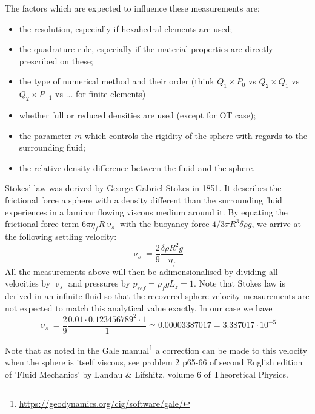 \noindent The factors which are expected to influence these measurements are:
\begin{itemize}
\item the resolution, especially if hexahedral elements are used;
\item the quadrature rule, especially if the material properties are directly prescribed on these;
\item the type of numerical method and their order (think $Q_1\times P_0$ vs $Q_2\times Q_1$ vs $Q_2 \times P_{-1}$
      vs ... for finite elements)
\item whether full or reduced densities are used (except for OT case);
\item the parameter $m$ which controls the rigidity of the sphere with regards to the surrounding fluid;
\item the relative density difference between the fluid and the sphere.
\end{itemize}

Stokes' law was derived by George Gabriel Stokes in 1851.  It describes the frictional force a sphere with
a density different than the surrounding fluid experiences in a laminar flowing viscous medium around it. 
By equating the frictional force term $6\pi \eta_f R \upnu_s$ with the buoyancy force $4/3 \pi R^3 \delta\rho g$, 
we arrive at the following settling velocity:
\[
\upnu_s = \frac{2}{9} \frac{\delta\rho R^2 g}{\eta_f}
\]
All the measurements above will then be adimensionalised by dividing all velocities by $\upnu_s$ and pressures
by $p_{ref}=\rho_f g L_z = 1$. Note that Stokes law is derived in an infinite fluid so that the recovered sphere 
velocity measurements are not expected to match this analytical value exactly.
In our case we have 
\[
\upnu_s = \frac29 \frac{0.01\cdot 0.123456789^2\cdot 1}{1} \simeq 0.00003387017 = 3.387017 \cdot 10^{-5}
\]

Note that as noted in the Gale manual\footnote{\url{https://geodynamics.org/cig/software/gale/}} 
a correction can be made
to this velocity when the sphere is itself viscous, see problem 2 p65-66
of second English edition of 'Fluid Mechanics' by Landau \& Lifshitz, volume 6
of Theoretical Physics.  


